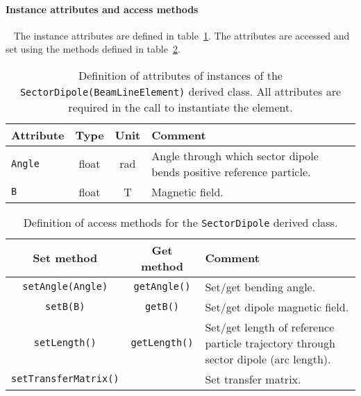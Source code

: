 \paragraph{Instance attributes and access methods} ~\newline
\label{SubSubSect:SDpl:InstAttr}
\noindent
The instance attributes are defined in
table~\ref{Tab:SDpl:Attributes}. 
The attributes are accessed and set using the methods defined in
table~\ref{Tab:SDpl:Methods}.
\begin{table}[h]
  \caption{
    Definition of attributes of instances of
    the \texttt{SectorDipole(BeamLineElement)} derived class.
    All attributes are required in the call to instantiate the
    element.
  }
  \label{Tab:SDpl:Attributes}
  \begin{center}
    \begin{tabular}{|l|c|c|p{10cm}|}
      \hline
      \textbf{Attribute}   & \textbf{Type} & \textbf{Unit} & \textbf{Comment}                      \\
      \hline
      \texttt{Angle}   & float & rad & Angle through which sector dipole bends positive reference
                                 particle.                                                         \\
      \texttt{B}       & float & T   & Magnetic field.                                             \\
      \hline
    \end{tabular}
  \end{center}
\end{table}
\begin{table}[h]
  \caption{
    Definition of access methods for the \texttt{SectorDipole} derived
    class. 
  }
  \label{Tab:SDpl:Methods}
  \begin{center}
    \begin{tabular}{|c|c|p{7cm}|}
      \hline
      \textbf{Set method} & \textbf{Get method}  & \textbf{Comment}       \\
      \hline
      \texttt{setAngle(Angle)}     & \texttt{getAngle()}  & Set/get bending angle.         \\
      \texttt{setB(B)}             & \texttt{getB()}      & Set/get dipole magnetic field. \\
      \texttt{setLength()}         & \texttt{getLength()} & Set/get length of reference
                                                            particle trajectory through
                                                            sector dipole (arc length).    \\
      \texttt{setTransferMatrix()} &                      & Set transfer matrix.           \\
      \hline
    \end{tabular}
  \end{center}
\end{table}

